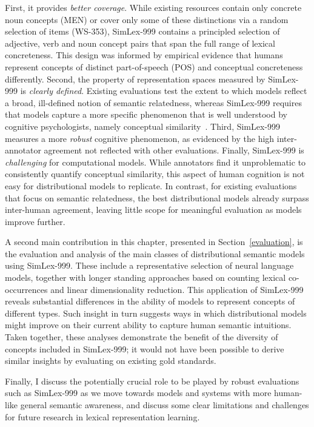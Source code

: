 First, it provides \emph{better coverage}. While existing resources contain only concrete noun concepts (MEN) or cover only some of these distinctions via a random selection of items (WS-353), SimLex-999 contains a principled selection of adjective, verb and noun concept pairs that span the full range of lexical concreteness. This design was informed by empirical evidence that humans represent concepts of distinct part-of-speech (POS) \citep{gentner1978relational} and conceptual concreteness \citep{hill2013quantitative} differently. Second, the property of representation spaces measured by SimLex-999 is \emph{clearly defined}. Existing evaluations test the extent to which models reflect a broad, ill-defined notion of semantic relatedness, whereas SimLex-999 requires that models capture a more specific phenomenon that is well understood by cognitive psychologists, namely conceptual similarity~\citep{tversky1977features}. Third, SimLex-999 measures a more \emph{robust} cognitive phenomenon, as evidenced by the high inter-annotator agreement not reflected with other evaluations. Finally,  SimLex-999 is \emph{challenging} for computational models. While annotators find it unproblematic to consistently quantify conceptual similarity, this aspect of human cognition is not easy for distributional models to replicate. In contrast, for existing evaluations that focus on semantic relatedness, the best distributional models already surpass inter-human agreement, leaving little scope for meaningful evaluation as models improve further. 

A second main contribution in this chapter, presented in Section~\ref{evaluation}, is the evaluation and analysis of the main classes of distributional semantic models using SimLex-999. These include a representative selection of neural language models, together with longer standing approaches based on counting lexical co-occurrences and linear dimensionality reduction. This application of SimLex-999 reveals substantial differences in the ability of models to represent concepts of different types. Such insight in turn suggests ways in which distributional models might improve on their current ability to capture human semantic intuitions. Taken together, these analyses demonstrate the benefit of the diversity of concepts included in SimLex-999; it would not have been possible to derive similar insights by evaluating on existing gold standards.

Finally, I discuss the potentially crucial role to be played by robust evaluations such as SimLex-999 as we move towards models and systems with more human-like general semantic awareness, and discuss some clear limitations and challenges for future research in lexical representation learning. 

